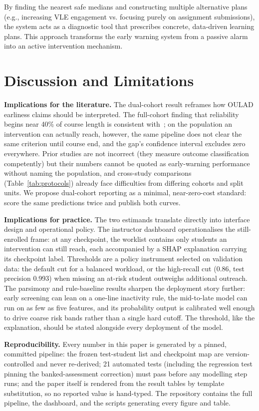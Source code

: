 \documentclass[conference]{IEEEtran}
\begin{document}
By finding the nearest safe medians and constructing multiple alternative plans (e.g., increasing VLE engagement vs. focusing purely on assignment submissions), the system acts as a diagnostic tool that prescribes concrete, data-driven learning plans. This approach transforms the early warning system from a passive alarm into an active intervention mechanism.

\section{Discussion and Limitations}

\textbf{Implications for the literature.}
The dual-cohort result reframes how OULAD earliness claims should be
interpreted. The full-cohort finding that reliability begins near 40\% of
course length is consistent with~\cite{adnan2021}; on the population an
intervention can actually reach, however, the same pipeline does not clear
the same criterion until course end, and the gap's confidence interval
excludes zero everywhere. Prior studies are not incorrect (they measure
outcome classification competently) but their numbers cannot be quoted as
early-warning performance without naming the population, and cross-study
comparisons (Table~\ref{tab:protocols}) already face difficulties from
differing cohorts and split units. We propose dual-cohort reporting as a
minimal, near-zero-cost standard: score the same predictions twice and
publish both curves.

\textbf{Implications for practice.}
The two estimands translate directly into interface design and operational
policy. The instructor dashboard operationalises the still-enrolled frame:
at any checkpoint, the worklist contains only students an intervention can
still reach, each accompanied by a SHAP explanation carrying its checkpoint
label. Thresholds are a policy instrument selected on validation data: the
default cut for a balanced workload, or the high-recall cut
(0.86, test precision 0.993) when
missing an at-risk student outweighs additional outreach. The parsimony and
rule-baseline results sharpen the deployment story further: early screening
can lean on a one-line inactivity rule, the mid-to-late model can run on as
few as five features, and its probability output is calibrated well enough
to drive coarse risk bands rather than a single hard cutoff. The threshold,
like the explanation, should be stated alongside every deployment of the
model.

\textbf{Reproducibility.}
Every number in this paper is generated by a pinned, committed pipeline:
the frozen test-student list and checkpoint map are version-controlled and
never re-derived; 21 automated tests (including the regression test pinning
the banked-assessment correction) must pass before any modelling step runs;
and the paper itself is rendered from the result tables by template
substitution, so no reported value is hand-typed. The repository contains
the full pipeline, the dashboard, and the scripts generating every figure
and table.
\end{document}
